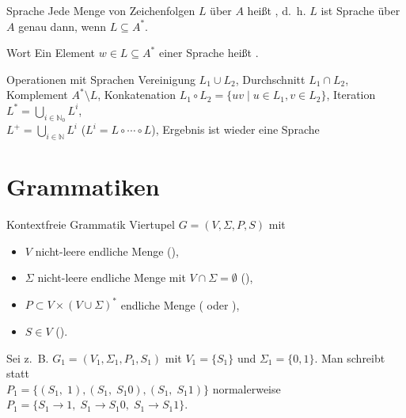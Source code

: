 \begin{Def}{Sprache}
    Jede Menge von Zeichenfolgen $L$ über $A$ heißt
    , d.~h. $L$ ist Sprache über $A$
    genau dann, wenn $L \subseteq A^\ast$.
\end{Def}

\begin{Def}{Wort}
    Ein Element $w \in L \subseteq A^\ast$ einer Sprache heißt .
\end{Def}

\begin{Def}{Operationen mit Sprachen}
    Vereinigung $L_1 \cup L_2$, Durchschnitt $L_1 \cap L_2$, \\
    Komplement $A^\ast \setminus L$,
    Konkatenation $L_1 \circ L_2 = \{uv \;|\;u \in L_1, v \in L_2\}$,
    Iteration $L^\ast = \bigcup_{i \in \mathbb{N}_0} L^i$, \\
    $L^+ = \bigcup_{i \in \mathbb{N}} L^i$ ($L^i = L \circ \cdots \circ L$),
    Ergebnis ist wieder eine Sprache
\end{Def}

\section{%
    Grammatiken%
}

\begin{Def}{Kontextfreie Grammatik}
    Viertupel $G = (V, \Sigma, P, S)$ mit
    \begin{itemize}
        \item $V$ nicht-leere endliche Menge
        (),

        \item $\Sigma$ nicht-leere endliche Menge mit
        $V \cap \Sigma = \emptyset$ (),

        \item $P \subset V \times (V \cup \Sigma)^\ast$ endliche Menge
        ( oder ),

        \item $S \in V$ ().
    \end{itemize}

    Sei z.~B. $G_1 = (V_1, \Sigma_1, P_1, S_1)$ mit $V_1 = \{S_1\}$ und
    $\Sigma_1 = \{0, 1\}$. Man schreibt statt \\
    $P_1 = \{(S_1,\; 1), (S_1,\; S_{1}0), (S_1,\; S_{1}1)\}$ normalerweise
    $P_1 = \{S_1 \rightarrow 1,\; S_1 \rightarrow S_{1}0,\;
    S_1 \rightarrow S_{1}1\}$.
\end{Def}


